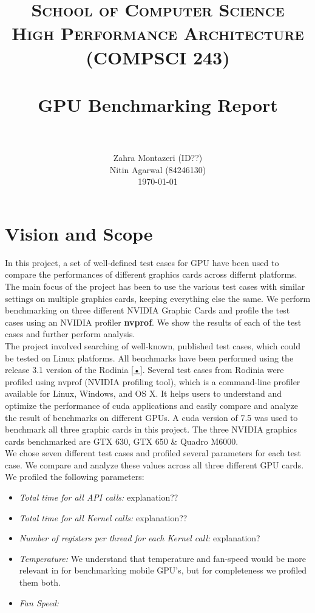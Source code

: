 \documentclass[paper=a4, fontsize=11pt]{scrartcl}
\title{
		\usefont{OT1}{bch}{b}{n}
		\normalfont \normalsize \textsc{School of Computer Science} \\ 
        \normalsize \textsc{High Performance Architecture (COMPSCI 243)} \\
        [25pt]
		\horrule{0.5pt} \\[0.4cm]
		\huge GPU Benchmarking Report \\
		\horrule{2pt} \\[0.5cm]
}
\author{
		\normalfont 								
        \normalsize
        Zahra Montazeri (ID??) \\[-3pt]		
        \normalsize 
        \newline
        \normalsize
        Nitin Agarwal (84246130) \\[-3pt]		
        \normalsize 
        \newline
        \newline
        \today
}
\date{}
\numberwithin{equation}{section}		%
\numberwithin{figure}{section}			%
\numberwithin{table}{section}				%
\begin{document}
\maketitle
\newpage
\tableofcontents
\newpage
\section{Vision and Scope}
In this project, a set of well-defined test cases for GPU have been used to compare the performances of different graphics cards across differnt platforms. The main focus of the project has been to use the various test cases with similar settings on multiple graphics cards, keeping everything else the same. We perform benchmarking on three different NVIDIA Graphic Cards and profile the test cases using an NVIDIA profiler \textbf{nvprof}. We show the results of each of the test cases and further perform analysis.\\

The project involved searching of well-known, published test cases, which could be tested on Linux platforms. All benchmarks have been performed using the release 3.1 version of the Rodinia \ref{•}. Several test cases from Rodinia were profiled using nvprof (NVIDIA profiling tool), which is a command-line profiler available for Linux, Windows, and OS X. It helps users to understand and optimize the performance of cuda applications and easily compare and analyze the result of benchmarks on different GPUs. A cuda version of 7.5 was used to benchmark all three graphic cards in this project. The three NVIDIA graphics cards benchmarked are GTX 630, GTX 650 \& Quadro M6000.\\

We chose seven different test cases and profiled several parameters for each test case. We compare and analyze these values across all three different GPU cards. We profiled the following parameters:

\begin{itemize}
\item
\textit{Total time for all API calls: } explanation??

\item
\textit{Total time for all Kernel calls: } explanation??

\item
\textit{Number of registers per thread for each Kernel call: } explanation?

\item
\textit{Temperature: } We understand that temperature and fan-speed would be more relevant in for benchmarking mobile GPU's, but for completeness we profiled them both.

\item
\textit{Fan Speed: }
\end{itemize}
\end{document}
